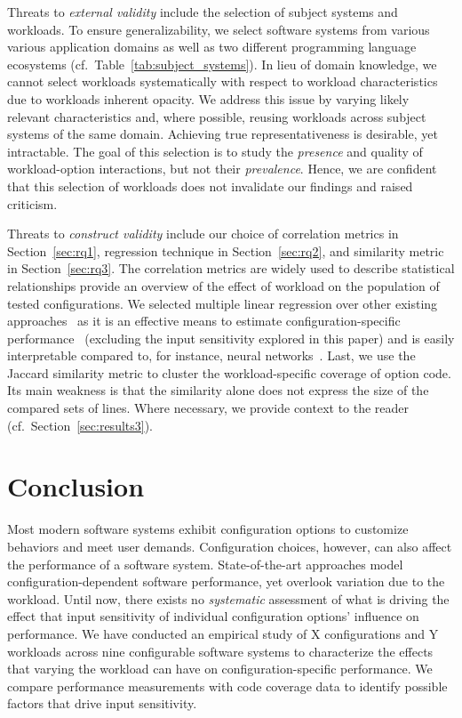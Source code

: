 {{Threats to\textit{ external validity} include the selection of subject systems and workloads. To ensure generalizability, we select software systems from various various application domains as well as two different programming language ecosystems (cf.~Table~\ref{tab:subject_systems}). In lieu of domain knowledge, we cannot select workloads systematically with respect to workload characteristics due to workloads inherent opacity. We address this issue by varying likely relevant characteristics and, where possible, reusing workloads across subject systems of the same domain. Achieving true representativeness is desirable, yet intractable. 
The goal of this selection is to study the \emph{presence} and quality of workload-option interactions, but not their \emph{prevalence}. Hence, we are confident that this selection of workloads does not invalidate our findings and raised criticism.

Threats to \textit{construct validity} include our choice of correlation metrics in Section~\ref{sec:rq1}, regression technique in Section~\ref{sec:rq2}, and similarity metric in Section~\ref{sec:rq3}. The correlation metrics are widely used to describe statistical relationships provide an overview of the effect of workload on the population of tested configurations. We selected multiple linear regression over other existing approaches~\cite{dorn2020,haDeepPerf2019,perfAL,guoVariabilityawarePerformancePrediction2013,sarkarCostEfficientSamplingPerformance,guo_2018_data,fourier_learning_2015,perLasso,chen_hinnperf_2022} as it is an effective means to estimate configuration-specific performance~\cite{siegmundPerformanceinfluenceModelsHighly2015} (excluding the input sensitivity explored in this paper) and is easily interpretable compared to, for instance, neural networks~\cite{haDeepPerf2019,perfAL,chen_hinnperf_2022}. Last, we use the Jaccard similarity metric to cluster the workload-specific coverage of option code. Its main weakness is that the similarity alone does not express the size of the compared sets of lines. Where necessary, we provide context to the reader (cf.~Section~\ref{sec:results3}). 
	

\section{Conclusion}\label{sec:conclusion}

Most modern software systems exhibit configuration options to customize behaviors and meet user demands. Configuration choices, however, can also affect the performance of a software system.
State-of-the-art approaches model configuration-dependent software performance, yet overlook variation due to the workload. Until now, there exists no \textit{systematic} assessment of what is driving the effect that input sensitivity of individual configuration options’ influence on performance. We have conducted an empirical study of {\color{red}X configurations and Y workloads across nine} configurable software systems to characterize the effects that varying the workload can have on configuration-specific performance. We compare performance measurements with code coverage data to identify possible factors that drive input sensitivity. 

}}
